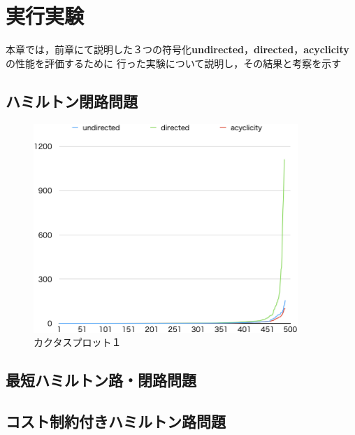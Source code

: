 \chapter{実行実験}
本章では，前章にて説明した３つの符号化\textbf{undirected}，\textbf{directed}，\textbf{acyclicity}の性能を評価するために
行った実験について説明し，その結果と考察を示す
\section{ハミルトン閉路問題}
\begin{figure}[htbp]
\begin{center}
  \includegraphics[width=10cm]{fig/cactus.png}
\caption{カクタスプロット１}
\label{cactus}
\end{center}
\end{figure}
\section{最短ハミルトン路・閉路問題}


\section{コスト制約付きハミルトン路問題}


